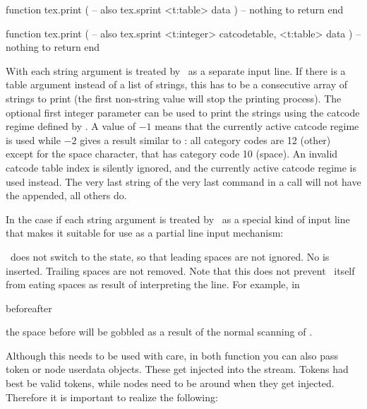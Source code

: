 function tex.print ( -- also tex.sprint
    <t:table> data
)
    -- nothing to return
end

function tex.print ( -- also tex.sprint
    <t:integer> catcodetable,
    <t:table>   data
)
    -- nothing to return
end
\stoptyping

With  each string argument is treated by \TEX\ as a separate
input line. If there is a table argument instead of a list of strings, this has
to be a consecutive array of strings to print (the first non-string value will
stop the printing process). The optional first integer parameter can be used to
print the strings using the catcode regime defined by \type {\catcodetable}. A
value of $-1$ means that the currently active catcode regime is used while $-2$
gives a result similar to \type {\the\toks}: all category codes are 12 (other)
except for the space character, that has category code 10 (space). An invalid
catcode table index is silently ignored, and the currently active catcode regime
is used instead. The very last string of the very last  command
in a \type {\directlua} call will not have the \type {\endlinechar} appended, all
others do.

In the case if  each string argument is treated by \TEX\ as a
special kind of input line that makes it suitable for use as a partial line input
mechanism:

\startitemize[packed]
\startitem
    \TEX\ does not switch to the  state, so that leading spaces
    are not ignored.
\stopitem
\startitem
    No \type {\endlinechar} is inserted.
\stopitem
\startitem
    Trailing spaces are not removed. Note that this does not prevent \TEX\ itself
    from eating spaces as result of interpreting the line. For example, in

    \starttyping
    beforeafter
    \stoptyping

    the space before  will be gobbled as a result of the \quote
    {normal} scanning of .
\stopitem
\stopitemize

Although this needs to be used with care, in both function you can also pass
token or node userdata objects. These get injected into the stream. Tokens had
best be valid tokens, while nodes need to be around when they get injected.
Therefore it is important to realize the following:

